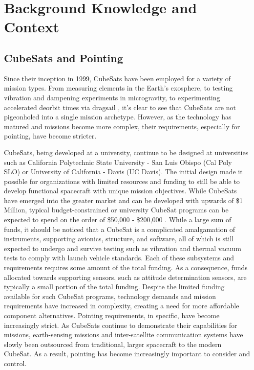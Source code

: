 \section{Background Knowledge and Context}

\subsection*{CubeSats and Pointing}

\par \qquad Since their inception in 1999, CubeSats have been employed for a variety of mission types. 
From measuring elements in the Earth's exosphere, to testing vibration and dampening experiments in microgravity, to experimenting accelerated deorbit times via dragsail \cite{PolySat}, it's clear to see that CubeSats are not pigeonholed into a single mission archetype.
However, as the technology has matured and missions become more complex, their requirements, especially for pointing, have become stricter.

\par \qquad CubeSats, being developed at a university, continue to be designed at universities such as California Polytechnic State University - San Luis Obispo (Cal Poly SLO) or University of California - Davis (UC Davis).
The initial design made it possible for organizations with limited resources and funding to still be able to develop functional spacecraft with unique mission objectives. 
While CubeSats have emerged into the greater market and can be developed with upwards of \$1 Million, typical budget-constrained or university CubeSat programs can be expected to spend on the order of \$50,000 - \$200,000 \cite{SmallSatMarket}.
While a large sum of funds, it should be noticed that a CubeSat is a complicated amalgamation of instruments, supporting avionics, structure, and software, all of which is still expected to undergo and survive testing such as vibration and thermal vacuum tests to comply with launch vehicle standards.
Each of these subsystems and requirements requires some amount of the total funding.
As a consequence, funds allocated towards supporting sensors, such as attitude determination sensors, are typically a small portion of the total funding. 
Despite the limited funding available for such CubeSat programs, technology demands and mission requirements have increased in complexity, creating a need for more affordable component alternatives.
Pointing requirements, in specific, have become increasingly strict.
As CubeSats continue to demonstrate their capabilities for missions, earth-sensing missions and inter-satellite communication systems have slowly been outsourced from traditional, larger spacecraft to the modern CubeSat.
As a result, pointing has become increasingly important to consider and control.

